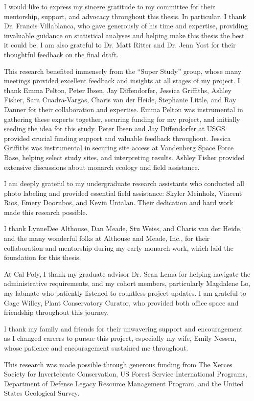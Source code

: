 
\begin{acknowledgments}

    I would like to express my sincere gratitude to my committee for their mentorship, support, and advocacy throughout this thesis. In particular, I thank Dr. Francis Villablanca, who gave generously of his time and expertise, providing invaluable guidance on statistical analyses and helping make this thesis the best it could be. I am also grateful to Dr. Matt Ritter and Dr. Jenn Yost for their thoughtful feedback on the final draft.

    This research benefited immensely from the ``Super Study'' group, whose many meetings provided excellent feedback and insights at all stages of my project. I thank Emma Pelton, Peter Ibsen, Jay Diffendorfer, Jessica Griffiths, Ashley Fisher, Sara Cuadra-Vargas, Charis van der Heide, Stephanie Little, and Ray Danner for their collaboration and expertise. Emma Pelton was instrumental in gathering these experts together, securing funding for my project, and initially seeding the idea for this study. Peter Ibsen and Jay Diffendorfer at USGS provided crucial funding support and valuable feedback throughout. Jessica Griffiths was instrumental in securing site access at Vandenberg Space Force Base, helping select study sites, and interpreting results. Ashley Fisher provided extensive discussions about monarch ecology and field assistance.

    I am deeply grateful to my undergraduate research assistants who conducted all photo labeling and provided essential field assistance: Skyler Meinholz, Vincent Rios, Emery Doornbos, and Kevin Untalan. Their dedication and hard work made this research possible.

    I thank LynneDee Althouse, Dan Meade, Stu Weiss, and Charis van der Heide, and the many wonderful folks at Althouse and Meade, Inc., for their collaboration and mentorship during my early monarch work, which laid the foundation for this thesis.

    At Cal Poly, I thank my graduate advisor Dr. Sean Lema for helping navigate the administrative requirements, and my cohort members, particularly Magdalene Lo, my labmate who patiently listened to countless project updates. I am grateful to Gage Willey, Plant Conservatory Curator, who provided both office space and friendship throughout this journey.

    I thank my family and friends for their unwavering support and encouragement as I changed careers to pursue this project, especially my wife, Emily Nessen, whose patience and encouragement sustained me throughout.

    This research was made possible through generous funding from The Xerces Society for Invertebrate Conservation, US Forest Service International Programs, Department of Defense Legacy Resource Management Program, and the United States Geological Survey.

\end{acknowledgments}
